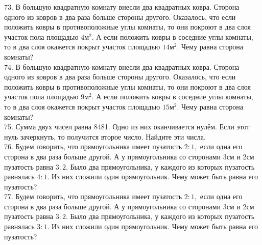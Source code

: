 \documentclass[12pt]{article}
\begin{document}
\begin{center}
\begin{figure}[ht!]
\end{figure}
\end{center}
73. В большую квадратную комнату внесли два квадратных ковра. Сторона одного из ковров в два раза больше стороны другого. Оказалось, что если положить ковры в противоположные углы комнаты, то они покроют в два слоя участок пола площадью $4\text{м}^2.$ А если положить ковры в соседние углы комнаты, то в два слоя окажется покрыт участок площадью $14\text{м}^2.$ Чему равна сторона комнаты?\\
74. В большую квадратную комнату внесли два квадратных ковра. Сторона одного из ковров в два раза больше стороны другого. Оказалось, что если положить ковры в противоположные углы комнаты, то они покроют в два слоя участок пола площадью $9\text{м}^2.$ А если положить ковры в соседние углы комнаты, то в два слоя окажется покрыт участок площадью $15\text{м}^2.$ Чему равна сторона комнаты?\\
75. Сумма двух чисел равна 8481. Одно из них оканчивается нулём. Если этот нуль зачеркнуть, то получится второе число. Найдите эти числа.\\
76. Будем говорить, что прямоугольника имеет пузатость $2:1,$ если одна его сторона в два раза больше другой. А у прямоугольника со сторонами 3см и 2см пузатость равна $3:2.$ Было два прямоугольника, у каждого из которых пузатость равнялась $4:1.$ Из них сложили один прямоугольник. Чему может быть равна его пузатость?\\
77. Будем говорить, что прямоугольника имеет пузатость $2:1,$ если одна его сторона в два раза больше другой. А у прямоугольника со сторонами 3см и 2см пузатость равна $3:2.$ Было два прямоугольника, у каждого из которых пузатость равнялась $3:1.$ Из них сложили один прямоугольник. Чему может быть равна его пузатость?\\
\end{document}
